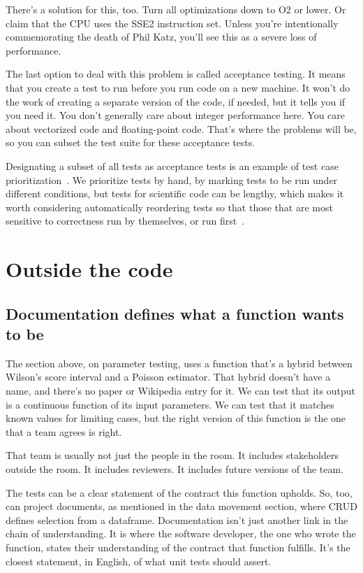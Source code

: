 \documentclass[fleqn,10pt]{olplainarticle}
\begin{document}
There's a solution for this, too. Turn all optimizations down
to O2 or lower. Or claim that the CPU uses the SSE2 instruction set.
Unless you're intentionally commemorating the death of Phil Katz, you'll see
this as a severe loss of performance.

The last option to deal with this problem is called acceptance
testing. It means that you create a test to run before you
run code on a new machine. It won't do the work of creating
a separate version of the code, if needed, but it tells you if
you need it. You don't generally care about integer performance
here. You care about vectorized code and floating-point code.
That's where the problems will be, so you can subset the test
suite for these acceptance tests.

Designating a subset of all tests as acceptance tests is an
example of test case prioritization~\cite{rothermel1999test}.
We prioritize tests by hand, by marking tests to be run under
different conditions, but tests for scientific code can be lengthy,
which makes it worth considering automatically reordering tests
so that those that are most sensitive to correctness run by 
themselves, or run first~\cite{yoo2012regression}.


\section{Outside the code}\label{sec:outside-code}

\subsection{Documentation defines what a function wants to be}

The section above, on parameter testing, uses a function that's a hybrid
between Wilson's score interval and a Poisson estimator. That hybrid
doesn't have a name, and there's no paper or Wikipedia entry for it.
We can test that its output is a continuous function of its input
parameters. We can test that it matches known values for limiting cases,
but the right version of this function is the one that a team agrees
is right.

That team is usually not just the people in the room. It includes stakeholders
outside the room. It includes reviewers. It includes future versions of the team.

The tests can be a clear statement of the contract this function upholds.
So, too, can project documents, as mentioned in the data movement section,
where CRUD defines selection from a dataframe. Documentation isn't just
another link in the chain of understanding. It is where the software
developer, the one who wrote the function, states their understanding
of the contract that function fulfills. It's the closest statement,
in English, of what unit tests should assert.
\end{document}

